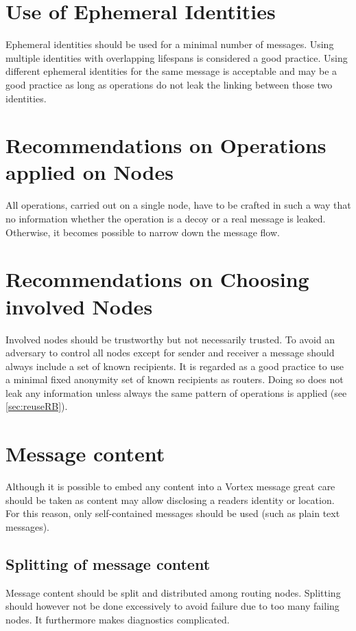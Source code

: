 \section{Use of Ephemeral Identities}
Ephemeral identities should be used for a minimal number of messages. Using multiple identities with overlapping lifespans is considered a good practice. Using different ephemeral identities for the same message is acceptable and may be a good practice as long as operations do not leak the linking between those two identities.

\section{Recommendations on Operations applied on Nodes}
All operations, carried out on a single node, have to be crafted in such a way that no information whether the operation is a decoy or a real message is leaked. Otherwise, it becomes possible to narrow down the message flow.

\section{Recommendations on Choosing involved Nodes}
Involved nodes should be trustworthy but not necessarily trusted. To avoid an adversary to control all nodes except for sender and receiver a message should always include a set of known recipients. It is regarded as a good practice to use a minimal fixed anonymity set of known recipients as routers. Doing so does not leak any information unless always the same pattern of operations is applied (see \ref{sec:reuseRB}).

\section{Message content}
Although it is possible to embed any content into a Vortex message great care should be taken as content may allow disclosing a readers identity or location. For this reason, only self-contained messages should be used (such as plain text messages).

\subsection{Splitting of message content}
Message content should be split and distributed among routing nodes. Splitting should however not be done excessively to avoid failure due to too many failing nodes. It furthermore makes diagnostics complicated. 

